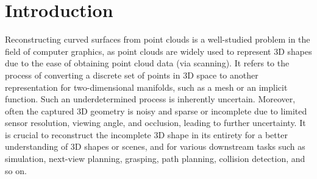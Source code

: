 \chapter{Introduction}\label{ch:introduction}
Reconstructing curved surfaces from point clouds is a well-studied problem in the field of computer graphics, as point clouds are widely used to represent 3D shapes due to the ease of obtaining point cloud data (via scanning). It refers to the process of converting a discrete set of points in 3D space to another representation for two-dimensional manifolds, such as a mesh or an implicit function. Such an underdetermined process is inherently uncertain. Moreover, often the captured 3D geometry is noisy and sparse or incomplete due to limited sensor resolution, viewing angle, and occlusion, leading to further uncertainty. It is crucial to reconstruct the incomplete 3D shape in its entirety for a better understanding of 3D shapes or scenes, and for various downstream tasks such as simulation, next-view planning, grasping, path planning, collision detection, and so on. 
\newline

